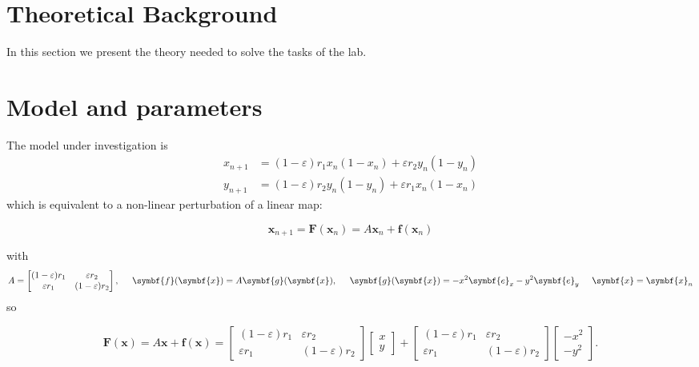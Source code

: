 \section{Theoretical Background}
In this section we present the theory needed to solve the tasks of the lab.


\newpage


\newpage



\newpage

\section{Model and parameters}
The model under investigation is
\begin{align}
	x_{n+1} &= (1-\varepsilon)r_1 x_n(1 - x_n) + \varepsilon r_2 y_n(1-y_n)\\
	y_{n+1} &= (1-\varepsilon)r_2 y_n(1 - y_n) + \varepsilon r_1 x_n(1-x_n)
\end{align}
which is equivalent to a non-linear perturbation of a linear map:

\begin{equation}
	\symbf{x}_{n+1} = \symbf{F}(\symbf{x}_n) = A \symbf{x}_n + \symbf{f}(\symbf{x}_n)
\end{equation}


with 
\begin{equation}
	A = 
    \begin{bmatrix}
			(1-\varepsilon)r_1 & \varepsilon r_2\\
			\varepsilon r_1 & (1- \varepsilon)r_2
    \end{bmatrix},
		\hspace{5mm}
		\symbf{f}(\symbf{x}) = A \symbf{g}(\symbf{x}),
		\hspace{5mm}
	\symbf{g}(\symbf{x}) = -x^2 \symbf{e}_x - y^2 \symbf{e}_y
		\hspace{5mm}
	\symbf{x} = \symbf{x}_n 
\end{equation}
so 

\begin{equation}
\symbf{F}(\symbf{x}) =
		A \symbf{x} +
		\symbf{f}(\symbf{x})
		=
		\begin{bmatrix}
			(1-\varepsilon)r_1 & \varepsilon r_2\\
			\varepsilon r_1 & (1- \varepsilon)r_2
    \end{bmatrix}
		\begin{bmatrix}
			x\\
			y
    \end{bmatrix}
		+
		\begin{bmatrix}
			(1-\varepsilon)r_1 & \varepsilon r_2\\
			\varepsilon r_1 & (1- \varepsilon)r_2
    \end{bmatrix}
		\begin{bmatrix}
			-x^2\\
			-y^2
    \end{bmatrix}.
\end{equation}

